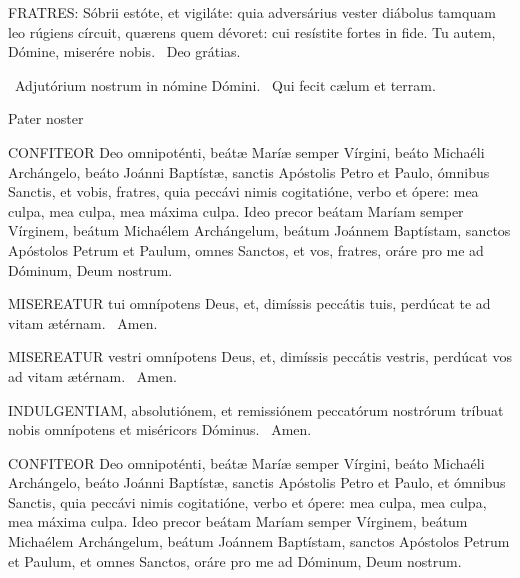 \lettrine[lines=2]{F}{RATRES}: Sóbrii estóte, et vigiláte: quia adversárius vester diábolus tamquam leo rúgiens círcuit, quærens quem dévoret: cui resístite fortes in fide. Tu autem, Dómine, miserére nobis. \R\ Deo grátias.

\V\ Adjutórium nostrum in nómine Dómini. \R\ Qui fecit cælum et terram.

Pater noster 


\lettrine[lines=2]{C}{ONFITEOR} Deo omnipoténti, beátæ Maríæ semper Vírgini, beáto Michaéli Archángelo, beáto Joánni Baptístæ, sanctis Apóstolis Petro et Paulo, ómnibus Sanctis, et vobis, fratres, quia peccávi nimis cogitatióne, verbo et ópere: mea culpa, mea culpa, mea máxima culpa. Ideo precor beátam Maríam semper Vírginem, beátum Michaélem Archángelum, beátum Joánnem Baptístam, sanctos Apóstolos Petrum et Paulum, omnes Sanctos, et vos, fratres, oráre pro me ad Dóminum, Deum nostrum.


\lettrine[lines=2]{M}{ISEREATUR} tui omnípotens Deus, et, dimíssis peccátis tuis, perdúcat te ad vitam ætérnam. \R\ Amen.



\lettrine[lines=2]{M}{ISEREATUR} vestri omnípotens Deus, et, dimíssis peccátis vestris, perdúcat vos ad vitam ætérnam. \R\ Amen.

\lettrine[lines=2]{I}{NDULGENTIAM}, absolutiónem, et remissiónem peccatórum nostrórum tríbuat nobis omnípotens et miséricors Dóminus. \R\ Amen.


\lettrine[lines=2]{C}{ONFITEOR} Deo omnipoténti, beátæ Maríæ semper Vírgini, beáto Michaéli Archángelo, beáto Joánni Baptístæ, sanctis Apóstolis Petro et Paulo, et ómnibus Sanctis, quia peccávi nimis cogitatióne, verbo et ópere: mea culpa, mea culpa, mea máxima culpa. Ideo precor beátam Maríam semper Vírginem, beátum Michaélem Archángelum, beátum Joánnem Baptístam, sanctos Apóstolos Petrum et Paulum, et omnes Sanctos, oráre pro me ad Dóminum, Deum nostrum.

